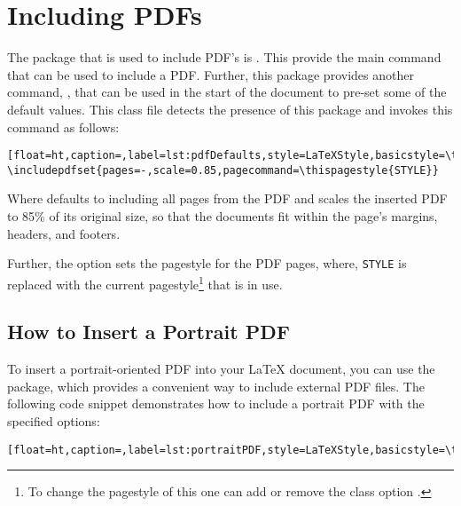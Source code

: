 \chapter{Including PDFs}\label{sec:includingpdfs}
	
	The package that is used to include PDF's is .
	This provide the main command  that can be used to include a PDF.
	Further, this package provides another command, , that can be used in the start of the document to pre-set some of the default values.
	This class file detects the presence of this package and invokes this command as follows:
	
	\begin{lstlisting}[float=ht,caption=,label=lst:pdfDefaults,style=LaTeXStyle,basicstyle=\ttfamily,]
\includepdfset{pages=-,scale=0.85,pagecommand=\thispagestyle{STYLE}}
	\end{lstlisting}
	Where  defaults to including all pages from the PDF and  scales the inserted PDF to 85\% of its original size, so that the documents fit within the page's margins, headers, and footers. 

	Further, the option  sets the pagestyle for the PDF pages, where, \texttt{STYLE} is replaced with the current pagestyle\footnote{To change the pagestyle of this one can add or remove the class option .} that is in use. 
	
	\section{How to Insert a Portrait PDF}
		To insert a portrait-oriented PDF into your LaTeX document, you can use the  package, which provides a convenient way to include external PDF files. 
		The following code snippet demonstrates how to include a portrait PDF with the specified options:

		\begin{lstlisting}[float=ht,caption=,label=lst:portraitPDF,style=LaTeXStyle,basicstyle=\ttfamily,]

		\end{lstlisting}


